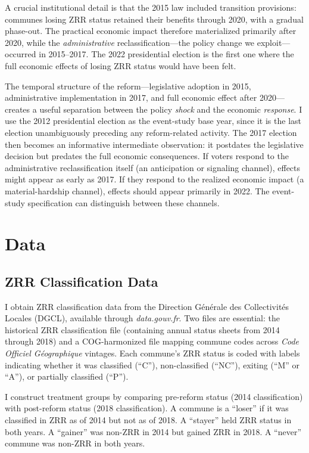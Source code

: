 \documentclass[12pt]{article}
\begin{document}
A crucial institutional detail is that the 2015 law included transition provisions: communes losing ZRR status retained their benefits through 2020, with a gradual phase-out. The practical economic impact therefore materialized primarily after 2020, while the \textit{administrative} reclassification---the policy change we exploit---occurred in 2015--2017. The 2022 presidential election is the first one where the full economic effects of losing ZRR status would have been felt.

The temporal structure of the reform---legislative adoption in 2015, administrative implementation in 2017, and full economic effect after 2020---creates a useful separation between the policy \textit{shock} and the economic \textit{response}. I use the 2012 presidential election as the event-study base year, since it is the last election unambiguously preceding any reform-related activity. The 2017 election then becomes an informative intermediate observation: it postdates the legislative decision but predates the full economic consequences. If voters respond to the administrative reclassification itself (an anticipation or signaling channel), effects might appear as early as 2017. If they respond to the realized economic impact (a material-hardship channel), effects should appear primarily in 2022. The event-study specification can distinguish between these channels.

\section{Data} \label{sec:data}

\subsection{ZRR Classification Data}

I obtain ZRR classification data from the Direction G\'{e}n\'{e}rale des Collectivit\'{e}s Locales (DGCL), available through \textit{data.gouv.fr}. Two files are essential: the historical ZRR classification file (containing annual status sheets from 2014 through 2018) and a COG-harmonized file mapping commune codes across \textit{Code Officiel G\'{e}ographique} vintages. Each commune's ZRR status is coded with labels indicating whether it was classified (``C''), non-classified (``NC''), exiting (``M'' or ``A''), or partially classified (``P'').

I construct treatment groups by comparing pre-reform status (2014 classification) with post-reform status (2018 classification). A commune is a ``loser'' if it was classified in ZRR as of 2014 but not as of 2018. A ``stayer'' held ZRR status in both years. A ``gainer'' was non-ZRR in 2014 but gained ZRR in 2018. A ``never'' commune was non-ZRR in both years.
\end{document}

